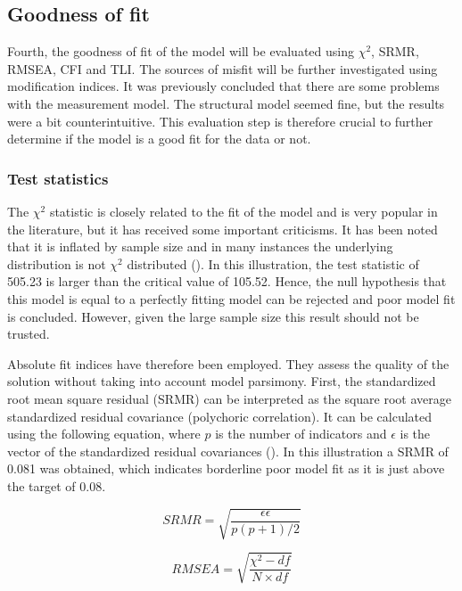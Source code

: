 \documentclass[11pt]{article}
\begin{document}
\pagebreak
\subsection{Goodness of fit}

Fourth, the goodness of fit of the model will be evaluated using $\chi^2$, SRMR,
RMSEA, CFI and TLI. The sources of misfit will be further investigated using
modification indices. It was previously concluded that there are some problems
with the measurement model. The structural model seemed fine, but the results
were a bit counterintuitive. This evaluation step is therefore crucial to
further determine if the model is a good fit for the data or not.

\subsubsection{Test statistics}

The $\chi^2$ statistic is closely related to the fit of the model and is very
popular in the literature, but it has received some important criticisms.
It has been noted that it is inflated by sample size and in many instances the
underlying distribution is not $\chi^2$ distributed (\cite{brown2015}).
In this illustration, the test statistic of 505.23 is larger than the critical
value of 105.52. Hence, the null hypothesis that this model is equal to a
perfectly fitting model can be rejected and poor model fit is concluded. However,
given the large sample size this result should not be trusted.

Absolute fit indices have therefore been employed. They assess the quality of
the solution without taking into account model parsimony. First, the standardized
root mean square residual (SRMR) can be interpreted as the square root average
standardized residual covariance (polychoric correlation). It can be calculated
using the following equation, where $p$ is the number of indicators and $\epsilon$
is the vector of the standardized residual covariances (\cite{shi2020}). In this
illustration a SRMR of 0.081 was obtained, which indicates borderline poor model
fit as it is just above the target of 0.08.

\begin{minipage}{0.48\linewidth}
\begin{equation}
\label{eq:srmr}
  SRMR = \sqrt{\dfrac{\epsilon \epsilon}{p(p+1)/2}}
\end{equation}
\end{minipage}
\begin{minipage}{0.48\linewidth}
\begin{equation}
\label{eq:rmsea}
  RMSEA = \sqrt{\dfrac{\chi^2 - df}{N \times df}}
\end{equation}
\end{minipage}
\end{document}
